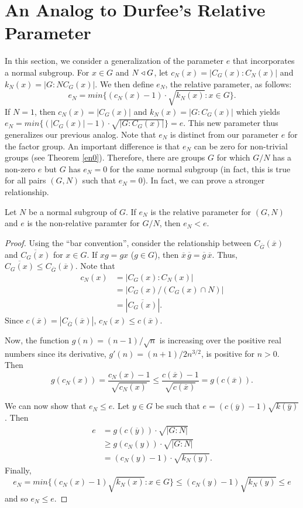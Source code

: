 \documentclass[main.tex]{subfiles}
\begin{document}
\chapter{An Analog to Durfee's Relative Parameter}

In this section, we consider a generalization of the parameter $e$ that incorporates a normal subgroup. For $x \in G$ and $N \triangleleft G$, let $c_N(x) = |C_G(x):C_N(x)|$ and $k_N(x) = |G:NC_G(x)|$. We then define $e_N$, the relative parameter, as follows:
$$e_N = min\{(c_N(x) - 1) \cdot \sqrt{k_N(x)} : x \in G\}\text{.}$$
If $N=1$, then $c_N(x) = |C_G(x)|$ and $k_N(x) = |G:C_G(x)|$ which yields $e_N = min\{(|C_G(x)| - 1)\cdot\sqrt{|G:C_G(x)|}\} = e$. This new parameter thus generalizes our previous analog. Note that $e_N$ is distinct from our parameter $e$ for the factor group. An important difference is that $e_N$ can be zero for non-trivial groups (see Theorem \ref{en0}). Therefore, there are groups $G$ for which $G/N$ has a non-zero $e$ but $G$ has $e_N = 0$ for the same normal subgroup (in fact, this is true for all pairs $(G, N)$ such that $e_N = 0$). In fact, we can prove a stronger relationship.

\begin{theorem}
Let $N$ be a normal subgroup of $G$. If $e_N$ is the relative parameter for $(G, N)$ and $e$ is the non-relative paramter for $G/N$, then $e_N < e$.
\end{theorem}

\begin{proof}
Using the ``bar convention'', consider the relationship between $C_{\overline{G}}(\overline{x})$ and $\overline{C_G(x)}$ for $x \in G$. If $xg = gx$ ($g \in G$), then $\overline{x}\, \overline{g} = \overline{g}\, \overline{x}$. Thus, $\overline{C_G(x)} \le C_{\overline{G}}(\overline{x})$. Note that
\begin{align*}
c_N(x) &= |C_G(x) : C_N(x)| \\
&= |C_G(x)/(C_G(x) \cap N)| \\
&= |\overline{C_G(x)}| \text{.}
\end{align*}
Since $c(\overline{x}) = |C_{\overline{G}}(\overline{x})|$, $c_N(x) \le c(\overline{x})$.

Now, the function $g(n) = (n-1)/\sqrt{n}$ is increasing over the positive real numbers since its derivative, $g'(n)=(n+1)/2n^{3/2}$, is positive for $n>0$. Then
$$g(c_N(x)) = \frac{c_N(x)-1}{\sqrt{c_N(x)}} \le \frac{c(\overline{x})-1}{\sqrt{c(\overline{x})}} = g(c(\overline{x}))\text{.}$$

We can now show that $e_N \le e$. Let $y \in G$ be such that $e = (c(\overline{y}) - 1) \sqrt{k(\overline{y})}$.  Then
\begin{align*}
e &= g(c(\overline{y})) \cdot \sqrt{|G:N|} \\
&\ge g(c_N(y)) \cdot \sqrt{|G:N|} \\
&= (c_N(y) - 1) \cdot \sqrt{k_N(y)} \text{.}
\end{align*}
Finally, 
$$e_N = min\{(c_N(x) - 1) \sqrt{k_N(x)} : x \in G\} \le (c_N(y) - 1) \sqrt{k_N(y)} \le e$$
and so $e_N \le e$.
\end{proof}
\end{document}
